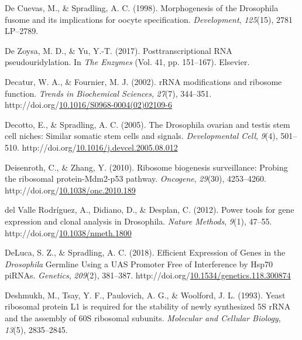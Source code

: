 \documentclass[12pt,oneside]{reedthesis}
\newlength{\cslhangindent}
\newenvironment{CSLReferences}[2] %
 {%
  \setlength{\parindent}{0pt}
  \ifodd #1 \everypar{\setlength{\hangindent}{\cslhangindent}}\ignorespaces\fi
  \ifnum #2 > 0
  \setlength{\parskip}{#2\baselineskip}
  \fi
 }%
 {}
\begin{document}
\begin{CSLReferences}{1}{0}
\leavevmode{}%
De Cuevas, M., \& Spradling, A. C. (1998). Morphogenesis of the {Drosophila} fusome and its implications for oocyte specification. \emph{Development}, \emph{125}(15), 2781 LP--2789.

\leavevmode{}%
De Zoysa, M. D., \& Yu, Y.-T. (2017). Posttranscriptional {RNA} pseudouridylation. In \emph{The {Enzymes}} (Vol. 41, pp. 151--167). {Elsevier}.

\leavevmode{}%
Decatur, W. A., \& Fournier, M. J. (2002). {rRNA} modifications and ribosome function. \emph{Trends in Biochemical Sciences}, \emph{27}(7), 344--351. http://doi.org/\href{https://doi.org/10.1016/S0968-0004(02)02109-6}{10.1016/S0968-0004(02)02109-6}

\leavevmode{}%
Decotto, E., \& Spradling, A. C. (2005). The {Drosophila} ovarian and testis stem cell niches: Similar somatic stem cells and signals. \emph{Developmental Cell}, \emph{9}(4), 501--510. http://doi.org/\href{https://doi.org/10.1016/j.devcel.2005.08.012}{10.1016/j.devcel.2005.08.012}

\leavevmode{}%
Deisenroth, C., \& Zhang, Y. (2010). Ribosome biogenesis surveillance: {Probing} the ribosomal protein-{Mdm2-p53} pathway. \emph{Oncogene}, \emph{29}(30), 4253--4260. http://doi.org/\href{https://doi.org/10.1038/onc.2010.189}{10.1038/onc.2010.189}

\leavevmode{}%
del Valle Rodríguez, A., Didiano, D., \& Desplan, C. (2012). Power tools for gene expression and clonal analysis in {Drosophila}. \emph{Nature Methods}, \emph{9}(1), 47--55. http://doi.org/\href{https://doi.org/10.1038/nmeth.1800}{10.1038/nmeth.1800}

\leavevmode{}%
DeLuca, S. Z., \& Spradling, A. C. (2018). Efficient {Expression} of {Genes} in the {\emph{Drosophila}} {Germline Using} a {UAS Promoter Free} of {Interference} by {Hsp70 piRNAs}. \emph{Genetics}, \emph{209}(2), 381--387. http://doi.org/\href{https://doi.org/10.1534/genetics.118.300874}{10.1534/genetics.118.300874}

\leavevmode{}%
Deshmukh, M., Tsay, Y. F., Paulovich, A. G., \& Woolford, J. L. (1993). Yeast ribosomal protein {L1} is required for the stability of newly synthesized {5S rRNA} and the assembly of {60S} ribosomal subunits. \emph{Molecular and Cellular Biology}, \emph{13}(5), 2835--2845.


\end{CSLReferences}
\end{document}
